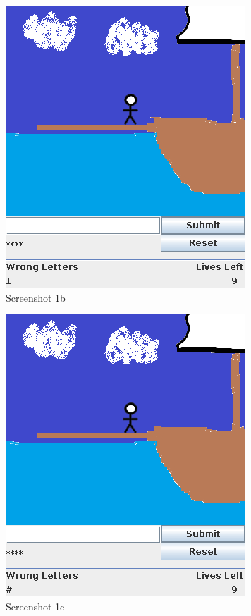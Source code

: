 \documentclass[notitlepage]{report}
\begin{document}
\begin{multicols}{2}
\begin{figure}[H]
\centering
\includegraphics[scale=0.5]{TestScreenshots/1b}
\caption{Screenshot 1b}
\end{figure}

\begin{figure}[H]
\centering
\includegraphics[scale=0.5]{TestScreenshots/1c}
\caption{Screenshot 1c}
\end{figure}


\end{multicols}
\end{document}
